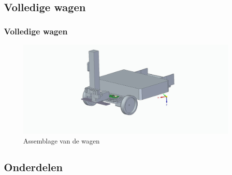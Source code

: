 \documentclass
   [kulak] %
   {kulakbeamer}
\begin{document}
%	

\subsection{Volledige wagen}
\begin{frame}
	\frametitle{Volledige wagen}
	\begin{figure}
		\centering
		\includegraphics[width=.95\textwidth]{assemblageAuto}
		\caption{Assemblage van de wagen}
	\end{figure}
\end{frame}

\subsection{Onderdelen}
\end{document}
